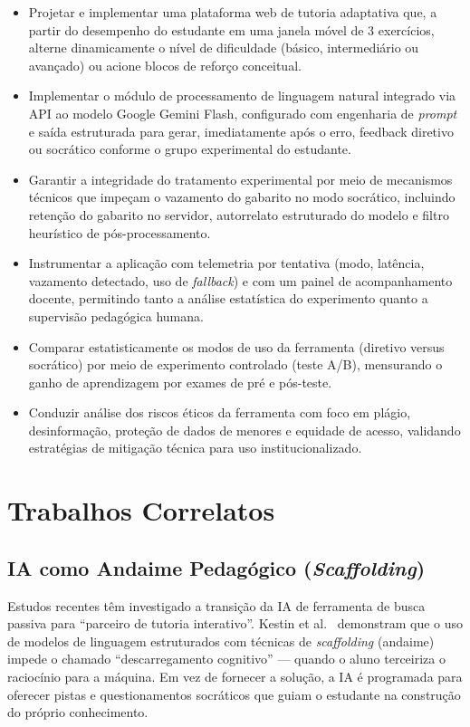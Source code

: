 \documentclass[10pt, a4paper, twocolumn]{article}
\begin{document}
\begin{itemize}[leftmargin=0.4cm, itemsep=2pt, parsep=0pt]
  \item Projetar e implementar uma plataforma web de tutoria adaptativa que,
  a partir do desempenho do estudante em uma janela móvel de 3 exercícios,
  alterne dinamicamente o nível de dificuldade (básico, intermediário ou
  avançado) ou acione blocos de reforço conceitual.
  \item Implementar o módulo de processamento de linguagem natural integrado via
  API ao modelo Google Gemini Flash, configurado com engenharia de
  \textit{prompt} e saída estruturada para gerar, imediatamente após o erro,
  feedback diretivo ou socrático conforme o grupo experimental do estudante.
  \item Garantir a integridade do tratamento experimental por meio de
  mecanismos técnicos que impeçam o vazamento do gabarito no modo socrático,
  incluindo retenção do gabarito no servidor, autorrelato estruturado do modelo
  e filtro heurístico de pós-processamento.
  \item Instrumentar a aplicação com telemetria por tentativa (modo, latência,
  vazamento detectado, uso de \textit{fallback}) e com um painel de
  acompanhamento docente, permitindo tanto a análise estatística do experimento
  quanto a supervisão pedagógica humana.
  \item Comparar estatisticamente os modos de uso da ferramenta (diretivo versus
  socrático) por meio de experimento controlado (teste A/B), mensurando o ganho
  de aprendizagem por exames de pré e pós-teste.
  \item Conduzir análise dos riscos éticos da ferramenta com foco em plágio,
  desinformação, proteção de dados de menores e equidade de acesso, validando
  estratégias de mitigação técnica para uso institucionalizado.
\end{itemize}

\section{Trabalhos Correlatos}
\label{sec:correlatos}

\subsection{IA como Andaime Pedagógico (\textit{Scaffolding})}

Estudos recentes têm investigado a transição da IA de ferramenta de busca
passiva para ``parceiro de tutoria interativo''. Kestin et
al.~\cite{kestin2025} demonstram que o uso de modelos de linguagem estruturados
com técnicas de \textit{scaffolding} (andaime) impede o chamado
``descarregamento cognitivo'' --- quando o aluno terceiriza o raciocínio para a
máquina. Em vez de fornecer a solução, a IA é programada para oferecer pistas e
questionamentos socráticos que guiam o estudante na construção do próprio
conhecimento.
\end{document}

